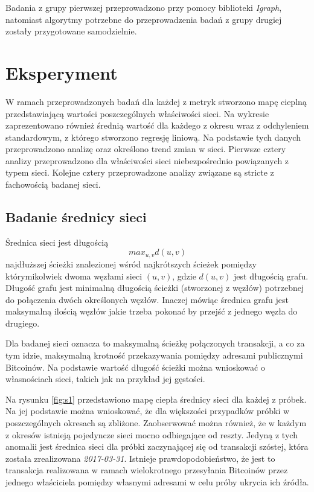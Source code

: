 \documentclass[12pt, twoside, final, openany]{mgr}
\begin{document}
\indent Badania z grupy pierwszej przeprowadzono przy pomocy biblioteki \textit{Igraph}, natomiast algorytmy potrzebne do przeprowadzenia badań z grupy drugiej zostały przygotowane samodzielnie.

\section{Eksperyment}
W ramach przeprowadzonych badań dla każdej z metryk stworzono mapę cieplną przedstawiającą wartości poszczególnych właściwości sieci. Na wykresie zaprezentowano również średnią wartość dla każdego z okresu wraz z odchyleniem standardowym, z którego stworzono regresję liniową. Na podstawie tych danych przeprowadzono analizę oraz określono trend zmian w sieci. Pierwsze cztery analizy przeprowadzono dla właściwości sieci niebezpośrednio powiązanych z typem sieci. Kolejne cztery przeprowadzone analizy związane są stricte z fachowością badanej sieci.  

\subsection{Badanie średnicy sieci}
\label{srednica_sieci}
\indent Średnica sieci jest długością 
\begin{equation}
\label{eq:srednica_sieci}
	max_{u,v}d(u,v)
\end{equation}
najdłuższej ścieżki znalezionej wśród najkrótszych ścieżek pomiędzy którymikolwiek dwoma węzłami sieci $(u,v)$, gdzie $d(u,v)$ jest długością grafu. Długość grafu jest minimalną długością ścieżki (stworzonej z węzłów) potrzebnej do połączenia dwóch określonych węzłów. Inaczej mówiąc średnica grafu jest maksymalną ilością węzłów jakie trzeba pokonać by przejść z jednego węzła do drugiego.

\indent Dla badanej sieci oznacza to maksymalną ścieżkę połączonych transakcji, a co za tym idzie, maksymalną krotność przekazywania pomiędzy adresami publicznymi Bitcoinów. Na podstawie wartość długość ścieżki można wnioskować o własnościach sieci, takich jak na przykład jej gęstości.

\indent Na rysunku \ref{fig:s1} przedstawiono mapę ciepła średnicy sieci dla każdej z próbek. Na jej podstawie można wnioskować, że dla większości przypadków próbki w poszczególnych okresach są zbliżone. Zaobserwować można również, że w każdym z okresów istnieją pojedyncze sieci mocno odbiegające od reszty. Jedyną z tych anomalii jest średnica sieci dla próbki zaczynającej się od transakcji szóstej, która została zrealizowana \textit{2017-03-31}. Istnieje prawdopodobieństwo, że jest to transakcja realizowana w ramach wielokrotnego przesyłania Bitcoinów przez jednego właściciela pomiędzy własnymi adresami w celu próby ukrycia ich źródła.
\end{document}

